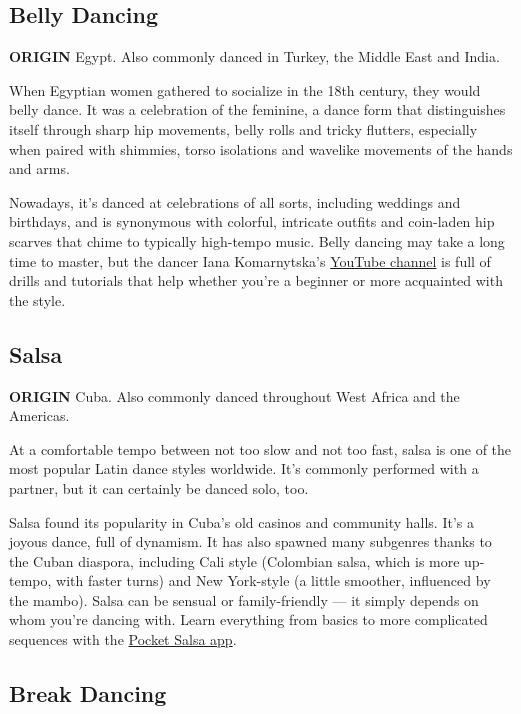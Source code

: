 \hypertarget{belly-dancing}{%
\subsection{Belly Dancing}\label{belly-dancing}}

\textbf{ORIGIN} Egypt. Also commonly danced in Turkey, the Middle East
and India.

When Egyptian women gathered to socialize in the 18th century, they
would belly dance. It was a celebration of the feminine, a dance form
that distinguishes itself through sharp hip movements, belly rolls and
tricky flutters, especially when paired with shimmies, torso isolations
and wavelike movements of the hands and arms.

Nowadays, it's danced at celebrations of all sorts, including weddings
and birthdays, and is synonymous with colorful, intricate outfits and
coin-laden hip scarves that chime to typically high-tempo music. Belly
dancing may take a long time to master, but the dancer Iana
Komarnytska's
\href{https://www.youtube.com/channel/UCT2GoXkVIWza-7ngoklxdaw}{YouTube
channel} is full of drills and tutorials that help whether you're a
beginner or more acquainted with the style.

\hypertarget{salsa}{%
\subsection{Salsa}\label{salsa}}

\textbf{ORIGIN} Cuba. Also commonly danced throughout West Africa and
the Americas.

At a comfortable tempo between not too slow and not too fast, salsa is
one of the most popular Latin dance styles worldwide. It's commonly
performed with a partner, but it can certainly be danced solo, too.

Salsa found its popularity in Cuba's old casinos and community halls.
It's a joyous dance, full of dynamism. It has also spawned many
subgenres thanks to the Cuban diaspora, including Cali style (Colombian
salsa, which is more up-tempo, with faster turns) and New York-style (a
little smoother, influenced by the mambo). Salsa can be sensual or
family-friendly --- it simply depends on whom you're dancing with. Learn
everything from basics to more complicated sequences with the
\href{https://www.addicted2salsa.com/pocketsalsa/}{Pocket Salsa app}.

\hypertarget{break-dancing}{%
\subsection{Break Dancing}\label{break-dancing}}


